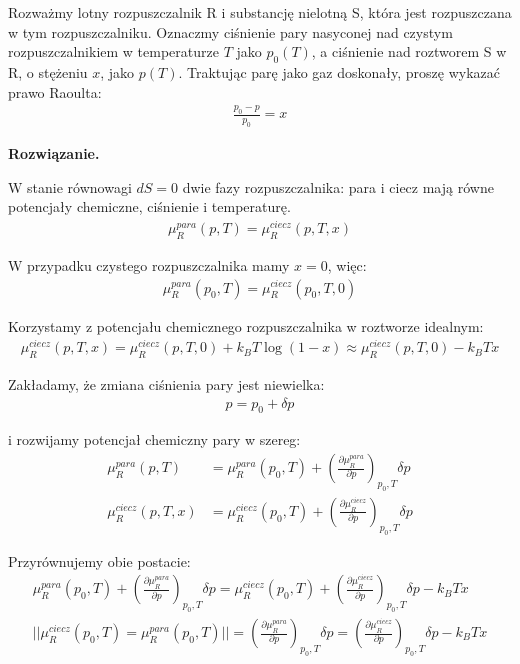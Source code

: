 \documentclass[11pt,a4paper]{article}
\newenvironment{solution}{\vspace{1cm} \par\textbf{Rozwiązanie.} \vspace{1cm}}{}
\begin{document}
Rozważmy lotny rozpuszczalnik R i substancję nielotną S, 
która jest rozpuszczana w tym rozpuszczalniku. Oznaczmy ciśnienie pary nasyconej 
nad czystym rozpuszczalnikiem w temperaturze $T$ jako $p_0(T)$, a ciśnienie nad 
roztworem S w R, o stężeniu $x$, jako $p(T)$. Traktując parę jako gaz doskonały, 
proszę wykazać prawo Raoulta:
\begin{align*}
\frac{p_0 - p}{p_0} = x
\end{align*}

\begin{solution}

W stanie równowagi $dS=0$ dwie fazy rozpuszczalnika: para i ciecz
mają równe potencjały chemiczne, ciśnienie i temperaturę. 
\begin{align*}
\mu_{R}^{para}(p,T) = \mu_{R}^{ciecz}(p,T,x)
\end{align*}

W przypadku czystego rozpuszczalnika mamy $x=0$, więc:
\begin{align*}
\mu_{R}^{para}(p_0,T) = \mu_{R}^{ciecz}(p_0,T,0)
\end{align*}

Korzystamy z potencjału chemicznego rozpuszczalnika w roztworze idealnym:
\begin{align*}
\mu_{R}^{ciecz}(p,T,x) = \mu_{R}^{ciecz}(p,T,0) + k_B T \log(1-x) \approx 
\mu_{R}^{ciecz}(p,T,0) - k_B T x
\end{align*}

Zakładamy, że zmiana ciśnienia pary jest niewielka:
\begin{align*}
  p = p_0 + \delta p
\end{align*}

i rozwijamy potencjał chemiczny pary w szereg:
\begin{align*}
\mu_{R}^{para}(p,T) &= \mu_{R}^{para}(p_0,T) + \left( \frac{\partial \mu_{R}^{para}}{\partial p} \right)_{p_0,T} \delta p  \\
\mu_{R}^{ciecz}(p,T, x) &= \mu_{R}^{ciecz}(p_0,T) + \left( \frac{\partial \mu_{R}^{ciecz}}{\partial p} \right)_{p_0,T} \delta p
\end{align*}

Przyrównujemy obie postacie:
\begin{align*}
\mu_{R}^{para}(p_0,T) + \left( \frac{\partial \mu_{R}^{para}}{\partial p} \right)_{p_0,T} \delta p  =
\mu_{R}^{ciecz}(p_0,T) + \left( \frac{\partial \mu_{R}^{ciecz}}{\partial p} \right)_{p_0,T} \delta p - k_B T x  \\
|| \mu_{R}^{ciecz}(p_0,T) = \mu_{R}^{para}(p_0,T) || =
\left( \frac{\partial \mu_{R}^{para}}{\partial p} \right)_{p_0,T} \delta p  =
\left( \frac{\partial \mu_{R}^{ciecz}}{\partial p} \right)_{p_0,T} \delta p - k_B T x 
\end{align*}


\end{solution}
\end{document}
